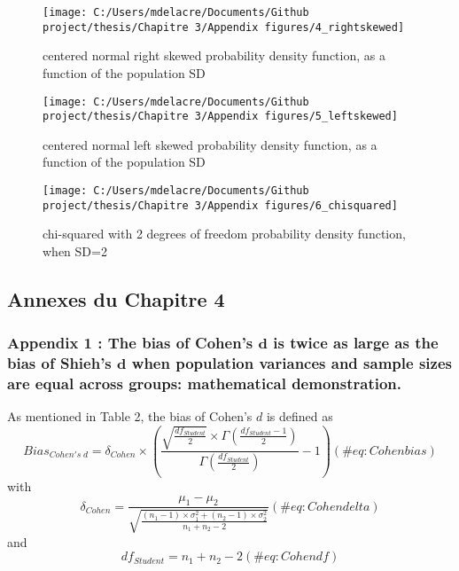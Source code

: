 \documentclass[
]{article}
\begin{document}
\begin{figure}
\texttt{[image: C:/Users/mdelacre/Documents/Github project/thesis/Chapitre 3/Appendix figures/4\_rightskewed]} \caption{centered normal right skewed probability density function, as a function of the population SD}\label{fig:unnamed-chunk-6}
\end{figure}

\begin{figure}
\texttt{[image: C:/Users/mdelacre/Documents/Github project/thesis/Chapitre 3/Appendix figures/5\_leftskewed]} \caption{centered normal left skewed probability density function, as a function of the population SD}\label{fig:unnamed-chunk-7}
\end{figure}

\begin{figure}
\texttt{[image: C:/Users/mdelacre/Documents/Github project/thesis/Chapitre 3/Appendix figures/6\_chisquared]} \caption{chi-squared with 2 degrees of freedom probability density function, when SD=2}\label{fig:unnamed-chunk-8}
\end{figure}

\newpage

\hypertarget{annexes-du-chapitre-4}{%
\subsection{Annexes du Chapitre 4}\label{annexes-du-chapitre-4}}

\hypertarget{appendix-1-the-bias-of-cohens-bmd-is-twice-as-large-as-the-bias-of-shiehs-bmd-when-population-variances-and-sample-sizes-are-equal-across-groups-mathematical-demonstration.}{%
\subsubsection{\texorpdfstring{Appendix 1 : The bias of Cohen's
\(\bm{d}\) is twice as large as the bias of Shieh's \(\bm{d}\) when
population variances and sample sizes are equal across groups:
mathematical
demonstration.}{Appendix 1 : The bias of Cohen's \textbackslash bm\{d\} is twice as large as the bias of Shieh's \textbackslash bm\{d\} when population variances and sample sizes are equal across groups: mathematical demonstration.}}\label{appendix-1-the-bias-of-cohens-bmd-is-twice-as-large-as-the-bias-of-shiehs-bmd-when-population-variances-and-sample-sizes-are-equal-across-groups-mathematical-demonstration.}}

As mentioned in Table 2, the bias of Cohen's \(d\) is defined as
\begin{equation} 
Bias_{Cohen's \; d}= \delta_{Cohen} \times \left( \frac{\sqrt{\frac{df_{Student}}{2}} \times \Gamma{\left(\frac{df_{Student}-1}{2}\right)}}{\Gamma{\left( \frac{df_{Student}}{2}\right)}} -1 \right)
(\#eq:Cohenbias)
\end{equation} with \begin{equation*} 
\delta_{Cohen}=\frac{\mu_1-\mu_2}{\sqrt{\frac{(n_1-1)\times \sigma^2_1+(n_2-1)\times\sigma^2_2}{n_1+n_2-2}}}
(\#eq:Cohendelta)
\end{equation*} and \begin{equation*} 
df_{Student}=n_1+n_2-2
(\#eq:Cohendf)
\end{equation*}
\end{document}
